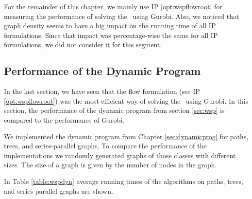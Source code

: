 For the remainder of this chapter, we mainly use IP \ref{opt:wspflowroot} for measuring the performance of solving the \WSP\ using Gurobi. Also, we noticed that graph density seems to have a big impact on the running time of all IP formulations. Since that impact was percentage-wise the same for all IP formulations, we did not consider it for this segment.\medskip


\subsection{Performance of the Dynamic Program}
\label{sec:study:dynprog}

In the last section, we have seen that the flow formulation (see IP \ref{opt:wspflowroot}) was the most efficient way of solving the \WSP\ using Gurobi. In this section, the performance of the dynamic program from section \ref{sec:wsp} is compared to the performance of Gurobi.\medskip

We implemented the dynamic program from Chapter \ref{sec:dynamicprog} for paths, trees, and series-parallel graphs. To compare the performance of the implementations we randomly generated graphs of those classes with different sizes. The size of a graph is given by the number of nodes in the graph.\medskip

In Table \ref{table:wspdyn} average running times of the algorithms on paths, trees, and series-parallel graphs are shown.

\begin{table}[H]
	\centering
	\caption{Computational performance of the dynamic program on random paths, trees and series-parallel graphs.}
	\label{table:wspdyn}
\end{table}

